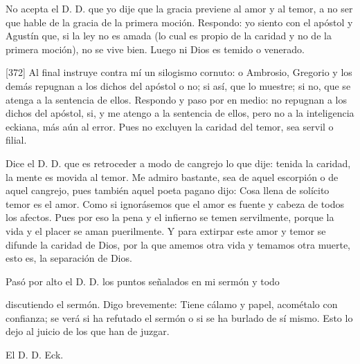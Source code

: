 No acepta el D. D. que yo dije que la gracia previene al amor y al temor, a no ser que hable de la gracia de la primera moción. Respondo: yo siento con el apóstol y Agustín que, si la ley no es amada (lo cual es propio de la caridad y no de la primera moción), no se vive bien. Luego ni Dios es temido o venerado.

[372] Al final instruye contra mí un silogismo cornuto: o Ambrosio, Gregorio y los demás repugnan a los dichos del apóstol o no; si así, que lo muestre; si no, que se atenga a la sentencia de ellos. Respondo y paso por en medio: no repugnan a los dichos del apóstol, si, y me atengo a la sentencia de ellos, pero no a la inteligencia eckiana, más aún al error. Pues no excluyen la caridad del temor, sea servil o filial.

Dice el D. D. que es retroceder a modo de cangrejo lo que dije: tenida la caridad, la mente es movida al temor. Me admiro bastante, sea de aquel escorpión o de aquel cangrejo, pues también aquel poeta pagano dijo: Cosa llena de solícito temor es el amor. Como si ignorásemos que el amor es fuente y cabeza de todos los afectos. Pues por eso la pena y el infierno se temen servilmente, porque la vida y el placer se aman puerilmente. Y para extirpar este amor y temor se difunde la caridad de Dios, por la que amemos otra vida y temamos otra muerte, esto es, la separación de Dios.

Pasó por alto el D. D. los puntos señalados en mi sermón y todo

discutiendo el sermón. Digo brevemente: Tiene cálamo y papel, acométalo con confianza; se verá si ha refutado el sermón o si se ha burlado de sí mismo. Esto lo dejo al juicio de los que han de juzgar.

El D. D. Eck.

